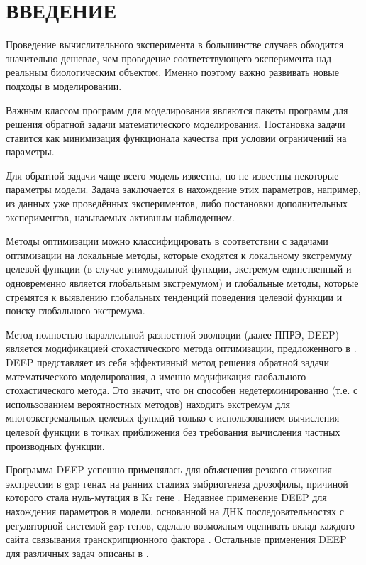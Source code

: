 \chapter*{ВВЕДЕНИЕ}

Проведение вычислительного эксперимента
в большинстве случаев обходится значительно дешевле,
чем проведение соответствующего эксперимента
над реальным биологическим объектом.
Именно поэтому важно развивать новые подходы в моделировании.

Важным классом программ для моделирования
являются пакеты программ
для решения обратной задачи математического моделирования.
Постановка задачи ставится
как минимизация функционала качества
при условии ограничений на параметры.

Для обратной задачи чаще всего модель известна,
но не известны некоторые параметры модели.
Задача заключается в нахождение этих параметров,
например, из данных уже проведённых экспериментов,
либо постановки дополнительных экспериментов,
называемых активным наблюдением.

Методы оптимизации можно классифицировать
в соответствии с задачами оптимизации
на локальные методы,
которые сходятся к локальному экстремуму целевой функции
(в случае унимодальной функции,
экстремум единственный и одновременно
является глобальным экстремумом)
и глобальные методы,
которые стремятся к выявлению
глобальных тенденций поведения целевой функции
и поиску глобального экстремума.

Метод полностью параллельной разностной эволюции
(далее ППРЭ, DEEP) \cite{Kozlov11, Kozlov13}
является модификацией стохастического метода оптимизации,
предложенного в \cite{Storn95}.
DEEP представляет из себя эффективный метод
решения обратной задачи математического моделирования,
а именно модификация глобального стохастического метода.
Это значит, что он способен недетерминированно
(т.е. с использованием вероятностных методов)
находить экстремум для многоэкстремальных целевых функций
только с использованием вычисления целевой функции
в точках приближения без требования вычисления частных производных функции.

Программа DEEP успешно применялась для объяснения
резкого снижения экспрессии в gap генах
на ранних стадиях эмбриогенеза дрозофилы,
причиной которого стала нуль-мутация в Kr гене \cite{kozlov2012modeling}.
Недавнее применение DEEP для нахождения
параметров в модели, основанной на
ДНК последовательностях с
регуляторной системой gap генов,
сделало возможным оценивать
вклад каждого сайта связывания
транскрипционного фактора \cite{kozlov2014sequence}.
Остальные применения DEEP
для различных задач описаны в
\cite{kozlov2013enhanced, ivanisenko2014new,
ivanisenko2013replication, kozlov2015differential}.

